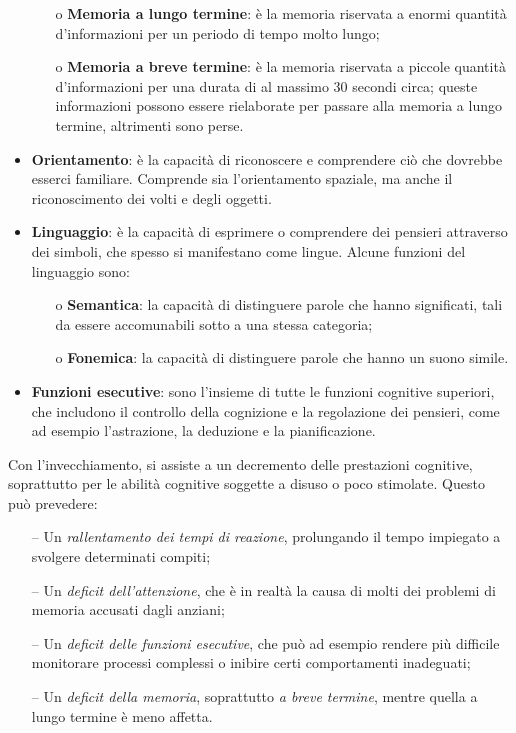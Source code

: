 \begin{itemize}
\begin{itemize}
          \item[o] \textbf{Memoria a lungo termine}: è la memoria riservata a
                enormi quantità d'informazioni per un periodo di tempo molto
                lungo;
          \item[o] \textbf{Memoria a breve termine}: è la memoria riservata a
                piccole quantità d'informazioni per una durata di al massimo 30
                secondi circa; queste informazioni possono essere rielaborate
                per passare alla memoria a lungo termine, altrimenti sono
                perse.
        \end{itemize}
  \item \textbf{Orientamento}: è la capacità di riconoscere e comprendere ciò
        che dovrebbe esserci familiare. Comprende sia l’orientamento spaziale,
        ma anche il riconoscimento dei volti e degli oggetti.
  \item \textbf{Linguaggio}: è la capacità di esprimere o comprendere dei
        pensieri attraverso dei simboli, che spesso si manifestano come lingue.
        Alcune funzioni del linguaggio sono:
        \begin{itemize}
          \item[o] \textbf{Semantica}: la capacità di distinguere parole che
                hanno significati, tali da essere accomunabili sotto a una
                stessa categoria;
          \item[o] \textbf{Fonemica}: la capacità di distinguere parole che
                hanno un suono simile.
        \end{itemize}
  \item \textbf{Funzioni esecutive}: sono l’insieme di tutte le funzioni
        cognitive superiori, che includono il controllo della cognizione e la
        regolazione dei pensieri, come ad esempio l’astrazione, la deduzione e
        la pianificazione.
\end{itemize}

Con l’invecchiamento, si assiste a un decremento delle prestazioni cognitive,
soprattutto per le abilità cognitive soggette a disuso o poco stimolate. Questo
può prevedere:
\begin{itemize}
  \item[--] Un \textit{rallentamento dei tempi di reazione}, prolungando il
        tempo impiegato a svolgere determinati compiti;
  \item[--] Un \textit{deficit dell’attenzione}, che è in realtà la causa di
        molti dei problemi di memoria accusati dagli anziani;
  \item[--] Un \textit{deficit delle funzioni esecutive}, che può ad esempio
        rendere più difficile monitorare processi complessi o inibire certi
        comportamenti inadeguati;
  \item[--] Un \textit{deficit della memoria}, soprattutto
        \textit{a breve termine}, mentre quella a lungo termine è meno affetta.
\end{itemize}


